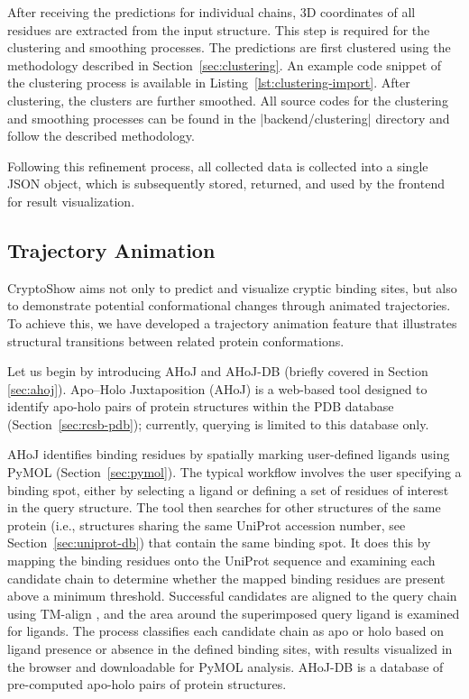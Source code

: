 After receiving the predictions for individual chains, 3D coordinates of all residues are extracted from the input structure. This step is required for the clustering and smoothing processes. The predictions are first clustered using the methodology described in Section~\ref{sec:clustering}. An example code snippet of the clustering process is available in Listing~\ref{lst:clustering-import}. After clustering, the clusters are further smoothed. All source codes for the clustering and smoothing processes can be found in the \inline|backend/clustering| directory and follow the described methodology.



Following this refinement process, all collected data is collected into a single JSON object, which is subsequently stored, returned, and used by the frontend for result visualization.

\subsection{Trajectory Animation}
\label{sec:trajectory}

CryptoShow aims not only to predict and visualize cryptic binding sites, but also to demonstrate potential conformational changes through animated trajectories. To achieve this, we have developed a trajectory animation feature that illustrates structural transitions between related protein conformations.

Let us begin by introducing AHoJ \cite{feidakis2022ahoj} and AHoJ-DB \cite{feidakis2024ahoj} (briefly covered in Section \ref{sec:ahoj}). Apo–Holo Juxtaposition (AHoJ) is a web-based tool designed to identify apo-holo pairs of protein structures within the PDB database (Section~\ref{sec:rcsb-pdb}); currently, querying is limited to this database only.

AHoJ identifies binding residues by spatially marking user-defined ligands using PyMOL (Section~\ref{sec:pymol}). The typical workflow involves the user specifying a binding spot, either by selecting a ligand or defining a set of residues of interest in the query structure. The tool then searches for other structures of the same protein (i.e., structures sharing the same UniProt accession number, see Section~\ref{sec:uniprot-db}) that contain the same binding spot. It does this by mapping the binding residues onto the UniProt sequence and examining each candidate chain to determine whether the mapped binding residues are present above a minimum threshold. Successful candidates are aligned to the query chain using TM-align \cite{zhang2005tm}, and the area around the superimposed query ligand is examined for ligands. The process classifies each candidate chain as apo or holo based on ligand presence or absence in the defined binding sites, with results visualized in the browser and downloadable for PyMOL analysis. AHoJ-DB is a database of pre-computed apo-holo pairs of protein structures.

